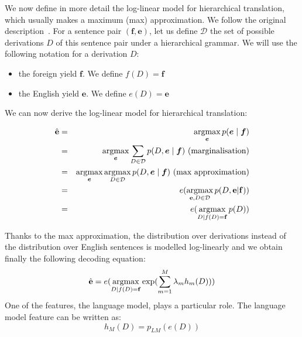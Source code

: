     We now define in more detail the log-linear model for hierarchical translation, which usually makes a maximum (max) approximation.
    We follow the original description~\citep{chiang:2007:CL}.
    For a sentence pair $(\bm{f}, \bm{e})$, let us define $\mathcal{D}$ the set of possible derivations $D$ of this sentence pair under 
    a hierarchical grammar. We will use the following notation for a derivation $D$:
    
    \begin{itemize}
      \item the foreign yield $\bm{f}$. We define $f(D) = \bm{f}$
      \item the English yield $\bm{e}$. We define $e(D) = \bm{e}$
    \end{itemize}

    We can now derive the log-linear model for hierarchical translation:

    \begin{eqnarray}
      \hat{{\bf e}} &=& \operatorname*{argmax}_{\bm{e}} p(\bm{e} \mid \bm{f}) \nonumber \\
                    &=& \operatorname*{argmax}_{\bm{e}} \sum_{D \in \mathcal{D}} p(D,\bm{e} \mid \bm{f}) \mbox{ (marginalisation)} \nonumber \\
                    &=& \operatorname*{argmax}_{\bm{e}} \operatorname*{argmax}_{D \in \mathcal{D}} p(D,\bm{e} \mid \bm{f}) \mbox{ (max approximation)} \nonumber \\
                    &=& e(\operatorname*{argmax}_{{\bf e},D \in \mathcal{D}} p(D,{\bf e}|{\bf f})) \nonumber \\
                    &=& e(\operatorname*{argmax}_{D | f(D) = {\bf f}} p(D))
    \end{eqnarray}

    Thanks to the max approximation, the distribution over derivations instead of the distribution over English
    sentences is modelled log-linearly and we obtain finally the following decoding equation:
%
    \begin{equation} \label{eq:decoding}
      \hat{{\bf e}} = e(\operatorname*{argmax}_{D | f(D) = {\bf f}} \exp(\sum_{m=1}^M \lambda_m h_m(D)))
    \end{equation}
%
    One of the features, the language model, plays a particular role. The language model feature can be written as:
%    
    \begin{equation}
      h_M(D) = p_{LM}(e(D))
    \end{equation}
    
